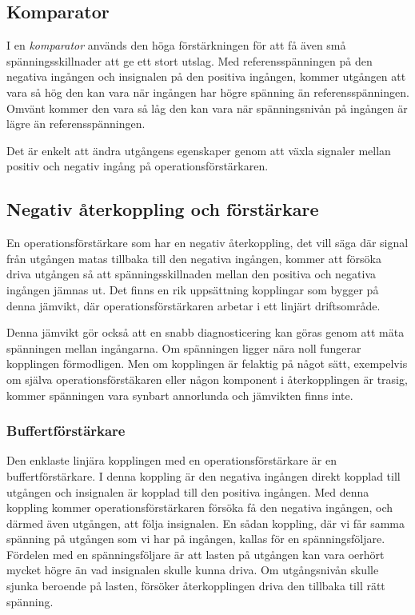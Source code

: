 \subsection{Komparator}

I en \emph{komparator} används den höga förstärkningen för att få även små
spänningsskillnader att ge ett stort utslag. Med referensspänningen på den
negativa ingången och insignalen på den positiva ingången, kommer utgången
att vara så hög den kan vara när ingången har högre spänning än referensspänningen. 
Omvänt kommer den vara så låg den kan vara när spänningsnivån på ingången är lägre än referensspänningen.

Det är enkelt att ändra utgångens egenskaper genom att växla signaler mellan positiv och negativ ingång på operationsförstärkaren.

\subsection{Negativ återkoppling och förstärkare}

En operationsförstärkare som har en negativ återkoppling, det vill säga där signal från utgången matas tillbaka till den negativa ingången, kommer att försöka driva utgången så att spänningsskillnaden mellan den positiva och negativa ingången jämnas ut.
Det finns en rik uppsättning kopplingar som bygger på denna jämvikt, där operationsförstärkaren arbetar i ett linjärt driftsområde.

Denna jämvikt gör också att en snabb diagnosticering kan göras genom att mäta spänningen mellan ingångarna. Om spänningen ligger nära noll fungerar kopplingen förmodligen. Men om kopplingen är felaktig på något sätt, exempelvis om själva operationsförstäkaren eller någon komponent i återkopplingen är trasig, kommer spänningen vara synbart annorlunda och jämvikten finns inte.

\subsubsection{Buffertförstärkare}

Den enklaste linjära kopplingen med en operationsförstärkare är en buffertförstärkare.
I denna koppling är den negativa ingången direkt kopplad till utgången och insignalen är kopplad till den positiva ingången.
Med denna koppling kommer operationsförstärkaren försöka få den negativa ingången, och därmed även utgången, att följa insignalen.
En sådan koppling, där vi får samma spänning på utgången som vi har på ingången, kallas för en spänningsföljare.
Fördelen med en spänningsföljare är att lasten på utgången kan vara oerhört mycket högre än vad insignalen skulle kunna driva. Om utgångsnivån skulle sjunka beroende på lasten, försöker återkopplingen driva den tillbaka till rätt spänning.

